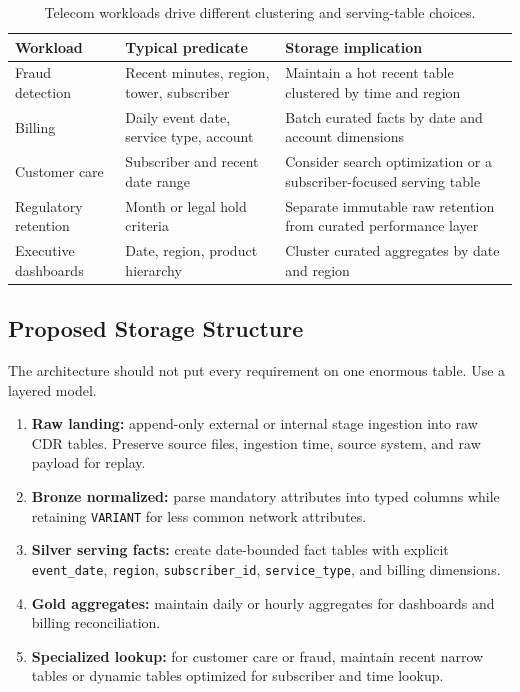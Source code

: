 \begin{table}[H]
\centering
\small
\begin{tabular}{@{}p{3.4cm}p{4.8cm}p{4.7cm}@{}}
\toprule
\textbf{Workload} & \textbf{Typical predicate} & \textbf{Storage implication} \\
\midrule
Fraud detection & Recent minutes, region, tower, subscriber & Maintain a hot recent table clustered by time and region \\
Billing & Daily event date, service type, account & Batch curated facts by date and account dimensions \\
Customer care & Subscriber and recent date range & Consider search optimization or a subscriber-focused serving table \\
Regulatory retention & Month or legal hold criteria & Separate immutable raw retention from curated performance layer \\
Executive dashboards & Date, region, product hierarchy & Cluster curated aggregates by date and region \\
\bottomrule
\end{tabular}
\caption{Telecom workloads drive different clustering and serving-table choices.}
\label{tab:chapter1-telecom-workloads}
\end{table}

\subsection{Proposed Storage Structure}
The architecture should not put every requirement on one enormous table. Use a layered model.
\begin{enumerate}
    \item \textbf{Raw landing:} append-only external or internal stage ingestion into raw CDR tables. Preserve source files, ingestion time, source system, and raw payload for replay.
    \item \textbf{Bronze normalized:} parse mandatory attributes into typed columns while retaining \texttt{VARIANT} for less common network attributes.
    \item \textbf{Silver serving facts:} create date-bounded fact tables with explicit \texttt{event\_date}, \texttt{region}, \texttt{subscriber\_id}, \texttt{service\_type}, and billing dimensions.
    \item \textbf{Gold aggregates:} maintain daily or hourly aggregates for dashboards and billing reconciliation.
    \item \textbf{Specialized lookup:} for customer care or fraud, maintain recent narrow tables or dynamic tables optimized for subscriber and time lookup.
\end{enumerate}

